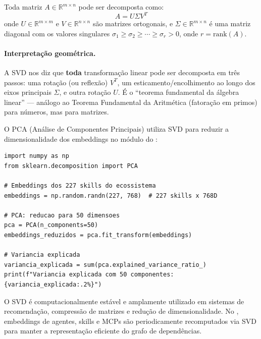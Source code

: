 \begin{definicao}
    Toda matriz $A \in \mathbb{R}^{m \times n}$ pode ser decomposta como:
    \[
    A = U \Sigma V^T
    \]
    onde $U \in \mathbb{R}^{m \times m}$ e $V \in \mathbb{R}^{n \times n}$
    são matrizes ortogonais, e $\Sigma \in \mathbb{R}^{m \times n}$ é uma
    matriz diagonal com os valores singulares $\sigma_1 \geq \sigma_2 \geq
    \cdots \geq \sigma_r > 0$, onde $r = \text{rank}(A)$.
\end{definicao}

\paragraph{Interpretação geométrica.} A SVD nos diz que \textbf{toda}
transformação linear pode ser decomposta em três passos: uma rotação
(ou reflexão) $V^T$, um esticamento/encolhimento ao longo dos eixos
principais $\Sigma$, e outra rotação $U$. É o ``teorema fundamental da
álgebra linear'' --- análogo ao Teorema Fundamental da Aritmética
(fatoração em primos) para números, mas para matrizes.

\begin{exemplo}
    O PCA (Análise de Componentes Principais) utiliza SVD para reduzir a
    dimensionalidade dos embeddings no módulo  do
    \opencodeeco{}:
    \begin{lstlisting}[style=pythonstyle]
import numpy as np
from sklearn.decomposition import PCA

# Embeddings dos 227 skills do ecossistema
embeddings = np.random.randn(227, 768)  # 227 skills x 768D

# PCA: reducao para 50 dimensoes
pca = PCA(n_components=50)
embeddings_reduzidos = pca.fit_transform(embeddings)

# Variancia explicada
variancia_explicada = sum(pca.explained_variance_ratio_)
print(f"Variancia explicada com 50 componentes: {variancia_explicada:.2%}")
    \end{lstlisting}
\end{exemplo}

\begin{observacao}
    O SVD é computacionalmente estável e amplamente utilizado em sistemas de
    recomendação, compressão de matrizes e redução de dimensionalidade. No
    \opencodeeco{}, embeddings de agentes, skills e MCPs são periodicamente
    recomputados via SVD para manter a representação eficiente do grafo de
    dependências.
\end{observacao}

